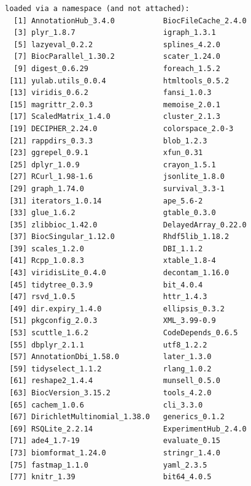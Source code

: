 \documentclass[
]{book}
\begin{document}
\begin{verbatim}
loaded via a namespace (and not attached):
  [1] AnnotationHub_3.4.0           BiocFileCache_2.4.0          
  [3] plyr_1.8.7                    igraph_1.3.1                 
  [5] lazyeval_0.2.2                splines_4.2.0                
  [7] BiocParallel_1.30.2           scater_1.24.0                
  [9] digest_0.6.29                 foreach_1.5.2                
 [11] yulab.utils_0.0.4             htmltools_0.5.2              
 [13] viridis_0.6.2                 fansi_1.0.3                  
 [15] magrittr_2.0.3                memoise_2.0.1                
 [17] ScaledMatrix_1.4.0            cluster_2.1.3                
 [19] DECIPHER_2.24.0               colorspace_2.0-3             
 [21] rappdirs_0.3.3                blob_1.2.3                   
 [23] ggrepel_0.9.1                 xfun_0.31                    
 [25] dplyr_1.0.9                   crayon_1.5.1                 
 [27] RCurl_1.98-1.6                jsonlite_1.8.0               
 [29] graph_1.74.0                  survival_3.3-1               
 [31] iterators_1.0.14              ape_5.6-2                    
 [33] glue_1.6.2                    gtable_0.3.0                 
 [35] zlibbioc_1.42.0               DelayedArray_0.22.0          
 [37] BiocSingular_1.12.0           Rhdf5lib_1.18.2              
 [39] scales_1.2.0                  DBI_1.1.2                    
 [41] Rcpp_1.0.8.3                  xtable_1.8-4                 
 [43] viridisLite_0.4.0             decontam_1.16.0              
 [45] tidytree_0.3.9                bit_4.0.4                    
 [47] rsvd_1.0.5                    httr_1.4.3                   
 [49] dir.expiry_1.4.0              ellipsis_0.3.2               
 [51] pkgconfig_2.0.3               XML_3.99-0.9                 
 [53] scuttle_1.6.2                 CodeDepends_0.6.5            
 [55] dbplyr_2.1.1                  utf8_1.2.2                   
 [57] AnnotationDbi_1.58.0          later_1.3.0                  
 [59] tidyselect_1.1.2              rlang_1.0.2                  
 [61] reshape2_1.4.4                munsell_0.5.0                
 [63] BiocVersion_3.15.2            tools_4.2.0                  
 [65] cachem_1.0.6                  cli_3.3.0                    
 [67] DirichletMultinomial_1.38.0   generics_0.1.2               
 [69] RSQLite_2.2.14                ExperimentHub_2.4.0          
 [71] ade4_1.7-19                   evaluate_0.15                
 [73] biomformat_1.24.0             stringr_1.4.0                
 [75] fastmap_1.1.0                 yaml_2.3.5                   
 [77] knitr_1.39                    bit64_4.0.5                  

\end{verbatim}
\end{document}
